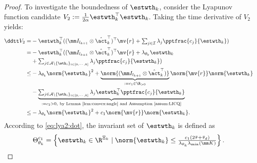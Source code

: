 \documentclass[lettersize,journal]{IEEEtran}
\newcommand*{\fe}{\mv{r}}
\begin{document}
\begin{proof}
To investigate the boundedness of $\estwth_k$, consider the Lyapunov function candidate $V_2:=\tfrac{1}{2\alpha}\estwth_k^\top \estwth_k$.
Taking the time derivative of $V_2$ yields:
\begin{equation}
    \begin{aligned}
        \ddtt  V_2 
        =& 
        -\estwth_k^\top 
        (
            (\mm I_{l_{k+1}}\otimes \hat\act_k^\top)^\top
            \fe
            +
            \textstyle\sum_{j\in\mathcal{I}}
            \lambda_j 
            \pptfrac{c_j}{\estwth_k}
        )
        \\
        =&
        -\estwth_k^\top 
        (
            (\mm I_{l_{k+1}}\otimes \hat\act_k^\top)^\top
            \fe
            +
            \lambda_{\theta_k}\estwth_k
        \\
        &
            +
            \textstyle\sum_{
                j\in\mathcal{A}\setminus \{\wth_i\}_{i\in[0,\cdots,k]}
            }
            \lambda_j 
            \pptfrac{c_j}{\estwth_k}
        )
        \\
        \le&
        -
        \lambda_{\theta_k}\norm{\estwth_k}^2
        +
        \underbrace{
            \norm{(\mm I_{l_{k+1}}\otimes \hat\act_k^\top)}
        }_{:=c_1\in\R_{>0}}
        \norm{\fe}
        \norm{\estwth_k}
        \\
        &
        -
        \underbrace{
        \textstyle\sum_{
            j\in\mathcal{A}\setminus \{\wth_i\}_{i\in[0,\cdots,k]}
        }
        \lambda_j 
        \estwth_k^\top \pptfrac{c_j}{\estwth_k}
        }_{:= c_2 >0,\ \text{by Lemma \ref{lem:convex:angle} and Assumption \ref{assum:LICQ}}}
        \\
        \le&
        -
        \lambda_{\theta_k}\norm{\estwth_k}^2
        +
        c_1     
        \norm{\fe}
        \norm{\estwth_k}
        .
    \end{aligned}
    \label{eq:lya2:dot}
\end{equation}
According to \eqref{eq:lya2:dot}, the invariant set of $\estwth_k$ is defined as
\begin{equation}
    \Theta_{\theta_k}^{c_1} 
    = 
    \left\{ 
        \estwth_k \in \R^{\Xi_{k}} 
        \mid 
        \norm{\estwth_k} 
        \le 
        \tfrac{
            c_1(2\bar\tau+\bar\tau_d)
        }{
            \lambda_{\theta_k}\lambda_{\min}(\mm K)
        }
    \right\}
    .
    \label{eq:invariant:c1:wth}
\end{equation}


\end{proof}
\end{document}
